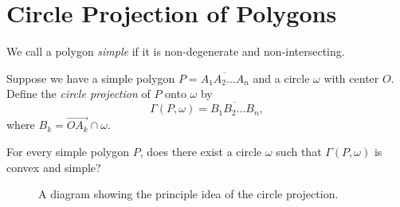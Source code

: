 \documentclass[a5paper, 10pt]{article}
\begin{document}
\section*{Circle Projection of Polygons}

\begin{definition}
    We call a polygon \textit{simple} if it is non-degenerate and non-intersecting.
\end{definition}

\begin{definition}
    Suppose we have a simple polygon \( P = \overline{A_1 A_2 \dots A_n} \) and a circle \( \omega \) with center \( O \). Define the \textit{circle projection} of \( P \) onto \( \omega \) by
    \[
        \Gamma (P, \omega) = \overline{B_1 B_2 \dots B_n}
    ,\]
    where \( B_k = \overrightarrow{OA_k} \cap \omega \).
\end{definition}

\begin{chirpbox}
\begin{problem}
    For every simple polygon \( P \), does there exist a circle \( \omega \) such that \( \Gamma (P, \omega) \) is convex and simple?
\end{problem}
\end{chirpbox}

\begin{figure}[!h]
    \centering
    \caption{A diagram showing the principle idea of the circle projection.}
\end{figure}
\end{document}
